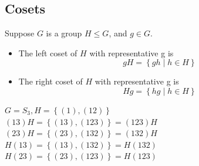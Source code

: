 \subsection{Cosets}

\begin{definition}
    Suppose $G$ is a group $H\leq G$, and $g\in G$.
    \begin{itemize}
        \item The left coset of $H$ with representative g is
        \[gH=\left\{ gh \mid h \in H \right\}\]
        \item The right coset of $H$ with representative g is
        \[Hg=\left\{ hg \mid h \in H \right\}\]
    \end{itemize}
\end{definition}

\begin{example}
    $G=S_3, H=\left\{ (1),(12) \right\}$\\
    $(13)H=\left\{ (13),(123) \right\}=(123)H$\\
    $(23)H=\left\{ (23),(132) \right\}=(132)H$\\
    $H(13)=\left\{ (13),(132) \right\}=H(132)$\\
    $H(23)=\left\{ (23),(123) \right\}=H(123)$
\end{example}


